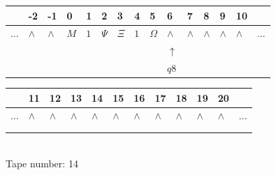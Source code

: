 \documentclass[11pt]{article}
\begin{document}
\begin{table}[H]
\centering
\begin{tabular}{lllllllllllllll}
 & -2 & -1 & 0 & 1 & 2 & 3 & 4 & 5 & 6 & 7 & 8 & 9 & 10 & \\
\hline
$...$ & \multicolumn{1}{|l|}{$\wedge$} & \multicolumn{1}{|l|}{$\wedge$} & \multicolumn{1}{|l|}{$M$} & \multicolumn{1}{|l|}{$1$} & \multicolumn{1}{|l|}{$\Psi$} & \multicolumn{1}{|l|}{$\Xi$} & \multicolumn{1}{|l|}{$1$} & \multicolumn{1}{|l|}{$\Omega$} & \multicolumn{1}{|l|}{$\wedge$} & \multicolumn{1}{|l|}{$\wedge$} & \multicolumn{1}{|l|}{$\wedge$} & \multicolumn{1}{|l|}{$\wedge$} & \multicolumn{1}{|l|}{$\wedge$} & $...$\\
\hline
&  &  &  &  &  &  &  &  & $\uparrow$ &  &  &  &  &  \\
&  &  &  &  &  &  &  &  & $ q8 $ &  &  &  &  &  \\
\end{tabular}
\begin{tabular}{llllllllllll}
 & 11 & 12 & 13 & 14 & 15 & 16 & 17 & 18 & 19 & 20 & \\
\hline
$...$ & \multicolumn{1}{|l|}{$\wedge$} & \multicolumn{1}{|l|}{$\wedge$} & \multicolumn{1}{|l|}{$\wedge$} & \multicolumn{1}{|l|}{$\wedge$} & \multicolumn{1}{|l|}{$\wedge$} & \multicolumn{1}{|l|}{$\wedge$} & \multicolumn{1}{|l|}{$\wedge$} & \multicolumn{1}{|l|}{$\wedge$} & \multicolumn{1}{|l|}{$\wedge$} & \multicolumn{1}{|l|}{$\wedge$} & $...$\\
\hline
&  &  &  &  &  &  &  &  &  &  &  \\
&  &  &  &  &  &  &  &  &  &  &  \\
\end{tabular}
\\
Tape number: 14
\noindent\makebox[\linewidth]{\hdashrule{\textwidth}{1pt}{1pt}}\end{table}
\end{document}
